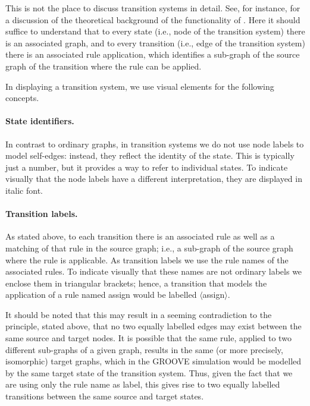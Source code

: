 This is not the place to discuss transition systems in detail. See, for
instance, \cite{Rensink2003a} for a discussion of the theoretical background of the
functionality of \Groove. Here it should suffice to understand that to every
state (i.e., node of the transition system) there is an associated graph, and
to every transition (i.e., edge of the transition system) there is an
associated rule application, which identifies a sub-graph of the source graph
of the transition where the rule can be applied.

In displaying a transition system, we use visual elements for the
following concepts.

\paragraph{State identifiers.}

In contrast to ordinary graphs, in transition systems we do not use node labels
to model self-edges: instead, they reflect the identity of the state. This is
typically just a number, but it provides a way to refer to individual
states. To indicate visually that the node labels have a different
interpretation, they are displayed in italic font.

\paragraph{Transition labels.}

As stated above, to each transition there is an associated rule as well as a
matching of that rule in the source graph; i.e., a sub-graph of the source
graph where the rule is applicable. As transition labels we use the rule names
of the associated rules. To indicate visually that these names are not ordinary
labels we enclose them in triangular brackets; hence, a transition that models
the application of a rule named \textsf{assign} would be labelled
\textsf{$\langle$assign$\rangle$}.

It should be noted that this may result in a seeming contradiction to the
principle, stated above, that no two equally labelled edges may exist between
the same source and target nodes. It is possible that the same rule, applied to
two different sub-graphs of a given graph, results in the same (or more
precisely, isomorphic) target graphs, which in the GROOVE simulation would be
modelled by the same target state of the transition system. Thus, given the
fact that we are using only the rule name as label, this gives rise to two
equally labelled transitions between the same source and target states.

